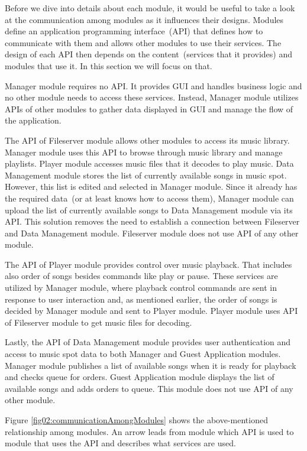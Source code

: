 Before we dive into details about each module, it would be useful to take a look at the communication among modules as it influences their designs. Modules define an application programming interface~(API) that defines how to communicate with them and allows other modules to use their services. The design of each API then depends on the content~(services that it provides) and modules that use it. In this section we will focus on that.
\par
Manager module requires no API. It provides GUI and handles business logic and no other module needs to access these services. Instead, Manager module utilizes APIs of other modules to gather data displayed in GUI and manage the flow of the application.
\par
The API of Fileserver module allows other modules to access its music library. Manager module uses this API to browse through music library and manage playlists. Player module accesses music files that it decodes to play music. Data Management module stores the list of currently available songs in music spot. However, this list is edited and selected in Manager module. Since it already has the required data~(or at least knows how to access them), Manager module can upload the list of currently available songs to Data Management module via its API. This solution removes the need to establish a connection between Fileserver and Data Management module. Fileserver module does not use API of any other module.
\par
The API of Player module provides control over music playback. That includes also order of songs besides commands like play or pause. These services are utilized by Manager module, where playback control commands are sent in response to user interaction and, as mentioned earlier, the order of songs is decided by Manager module and sent to Player module. Player module uses API of Fileserver module to get music files for decoding.
\par
Lastly, the API of Data Management module provides user authentication and access to music spot data to both Manager and Guest Application modules. Manager module publishes a list of available songs when it is ready for playback and checks queue for orders. Guest Application module displays the list of available songs and adds orders to queue. This module does not use API of any other module.
\par
Figure \ref{fig02:communicationAmongModules} shows the above-mentioned relationship among modules. An arrow leads from module which API is used to module that uses the API and describes what services are used.

